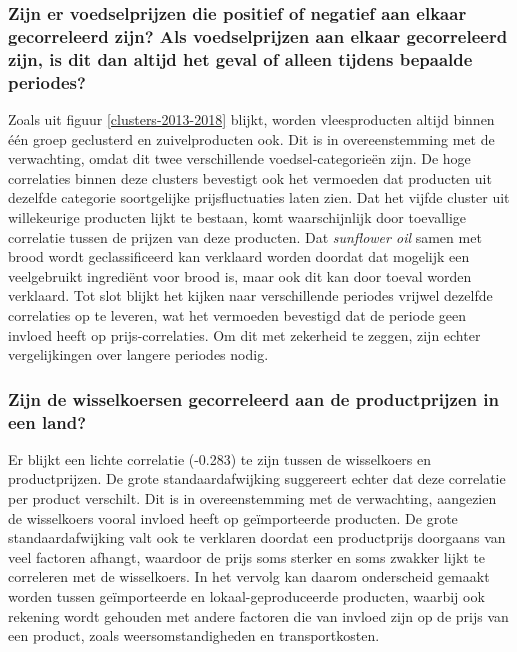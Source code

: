 \documentclass{article}
\begin{document}
\subsubsection*{Zijn er voedselprijzen die positief of negatief aan elkaar gecorreleerd zijn? Als voedselprijzen aan elkaar gecorreleerd zijn, is dit dan altijd het geval of alleen tijdens bepaalde periodes?}
Zoals uit figuur \ref{clusters-2013-2018} blijkt, worden vleesproducten altijd binnen één groep geclusterd en zuivelproducten ook. Dit is in overeenstemming met de verwachting, omdat dit twee verschillende voedsel-categorieën zijn. De hoge correlaties binnen deze clusters bevestigt ook het vermoeden dat producten uit dezelfde categorie soortgelijke prijsfluctuaties laten zien. Dat het vijfde cluster uit willekeurige producten lijkt te bestaan, komt waarschijnlijk door toevallige correlatie tussen de prijzen van deze producten. Dat \textit{sunflower oil} samen met brood wordt geclassificeerd kan verklaard worden doordat dat mogelijk een veelgebruikt ingrediënt voor brood is, maar ook dit kan door toeval worden verklaard.
Tot slot blijkt het kijken naar verschillende periodes vrijwel dezelfde correlaties op te leveren, wat het vermoeden bevestigd dat de periode geen invloed heeft op prijs-correlaties. Om dit met zekerheid te zeggen, zijn echter vergelijkingen over langere periodes nodig.




\subsubsection*{Zijn de wisselkoersen gecorreleerd aan de productprijzen in een land?}
Er blijkt een lichte correlatie (-0.283) te zijn tussen de wisselkoers en productprijzen. De grote standaardafwijking suggereert echter dat deze correlatie per product verschilt. Dit is in overeenstemming met de verwachting, aangezien de wisselkoers vooral invloed heeft op geïmporteerde producten. De grote standaardafwijking valt ook te verklaren doordat een productprijs doorgaans van veel factoren afhangt, waardoor de prijs soms sterker en soms zwakker lijkt te correleren met de wisselkoers. In het vervolg kan daarom onderscheid gemaakt worden tussen geïmporteerde en lokaal-geproduceerde producten, waarbij ook rekening wordt gehouden met andere factoren die van invloed zijn op de prijs van een product, zoals weersomstandigheden en transportkosten.
\end{document}
